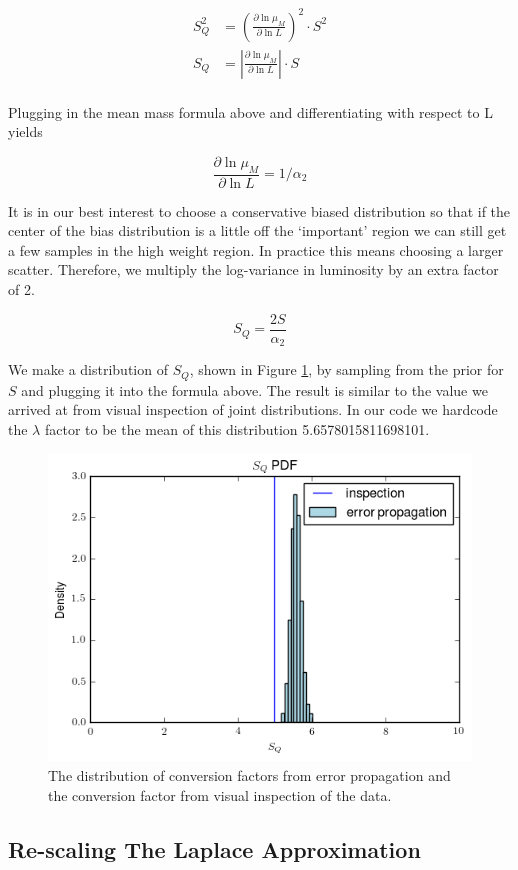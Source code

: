 \documentclass[\docopts]{\docclass}
\begin{document}
\begin{align*}
S_Q^2 &= \left(\frac{\partial \ln \mu_M}{\partial \ln L}\right)^2 \cdot S^2\\
S_Q &= \left|\frac{\partial \ln \mu_M}{\partial \ln L}\right| \cdot S\\
\end{align*}

\noindent Plugging in the mean mass formula above and differentiating with respect to L yields

$$\frac{\partial \ln \mu_M}{\partial \ln L} = 1/\alpha_2$$

\noindent It is in our best interest to choose a conservative biased distribution so that if the center of the bias distribution is a little off the `important' region we can still get a few samples in the high weight region. In practice this means choosing a larger scatter. Therefore, we multiply the log-variance in luminosity by an extra factor of 2.

$$S_Q = \frac{2S}{\alpha_2}$$

\noindent We make a distribution of $S_Q$, shown in Figure \ref{fig:error_prop}, by sampling from the prior for $S$ and plugging it into the formula above. The result is similar to the value we arrived at from visual inspection of joint distributions. In our code we hardcode the $\lambda$ factor to be the mean of this distribution 5.6578015811698101.

\begin{figure}[h]
\centering
\includegraphics[width=0.6\columnwidth]{error_prop.png}
\caption{
The distribution of conversion factors from error propagation and the conversion factor from visual inspection of the data. 
\label{fig:error_prop}}
\end{figure}

\newpage

\subsection{Re-scaling The Laplace Approximation}
\label{subsec:rescale_la}
\end{document}

